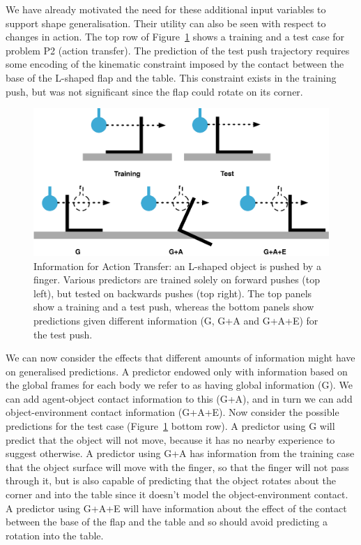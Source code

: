 We have already motivated the need for these additional input
variables to support shape generalisation. Their utility can also be seen with respect to changes in
action. The top row of Figure~\ref{fig:ToyExample} shows a training
and a test case for problem P2 (action transfer). The prediction of the test push trajectory requires some encoding of the kinematic constraint imposed by the contact between the base of the L-shaped flap and the table. This constraint exists in the training push, but was not significant since the flap could rotate on its corner.

\begin{figure}[b]
\centerline{\includegraphics[width=0.8\columnwidth]{BackPushToyExample}}
\caption[ToyExample]{Information for Action Transfer: an L-shaped object is pushed by a finger. Various predictors are trained solely on forward pushes (top left), but tested on backwards pushes (top right). The top panels show a training and a test push, whereas the bottom panels show predictions given different information (G, G+A and G+A+E) for the test push.}
\label{fig:ToyExample}
\end{figure}

We can now consider the effects that different amounts of information
might have on generalised predictions. A predictor endowed only with
information based on the global frames for each body we refer to as
having global information (G). We can add agent-object contact
information to this (G+A), and in turn we can add object-environment
contact information (G+A+E). Now consider the possible predictions for
the test case (Figure~\ref{fig:ToyExample} bottom row). A predictor
using G will predict that the object will not move, because it has no
nearby experience to suggest otherwise. A predictor using G+A has
information from the training case that the object surface will move
with the finger, so that the finger will not pass through it, but is
also capable of predicting that the object rotates about the corner
and into the table since it doesn't model the object-environment
contact. A predictor using G+A+E will have information about the
effect of the contact between the base of the flap and the table and
so should avoid predicting a rotation into the table.

